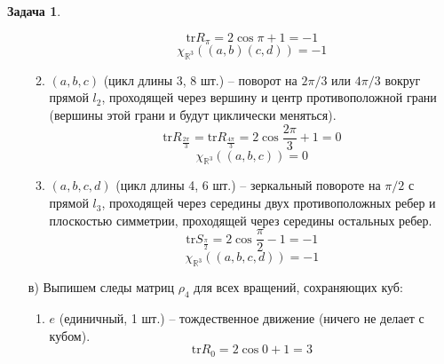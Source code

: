 \documentclass[12pt]{article}
\theoremstyle{definition}
\newtheorem{zad}{Задача}[section]
\begin{document}
\begin{zad}
\begin{itemize}
\begin{enumerate}
\begin{equation}
            \text{tr}R_\pi=2\cos\pi+1=-1
        \end{equation}
        \begin{equation}
            \boxed{\chi_{\mathbb{R}^3}((a,b)(c,d))=-1}
        \end{equation}
        \item $(a,b,c)$ (цикл длины 3, 8 шт.) -- поворот на $2\pi/3$ или $4\pi/3$ вокруг прямой $l_2$, проходящей через вершину и центр противоположной грани (вершины этой грани и будут циклически меняться).
        \begin{equation}
            \text{tr}R_{\frac{2\pi}{3}}=\text{tr}R_{\frac{4\pi}{3}}=2\cos{\frac{2\pi}{3}}+1=0
        \end{equation}
        \begin{equation}
            \boxed{\chi_{\mathbb{R}^3}((a,b,c))=0}
        \end{equation}
        \item $(a,b,c,d)$ (цикл длины 4, 6 шт.) -- зеркальный повороте на $\pi/2$ с прямой $l_3$, проходящей через середины двух противоположных ребер и плоскостью симметрии, проходящей через середины остальных ребер.
        \begin{equation}
            \text{tr}S_{\frac{\pi}{2}}=2\cos{\frac{\pi}{2}}-1=-1
        \end{equation}
        \begin{equation}
            \boxed{\chi_{\mathbb{R}^3}((a,b,c,d))=-1}
        \end{equation}
    \end{enumerate}
    \item[в)] Выпишем следы матриц $\rho_4$ для всех вращений, сохраняющих куб:
    \begin{enumerate}
        \item $e$ (единичный, 1 шт.) -- тождественное движение (ничего не делает с кубом).
        \begin{equation}
            \text{tr}R_0=2\cos 0+1=3

\end{equation}
\end{enumerate}
\end{itemize}
\end{zad}
\end{document}
